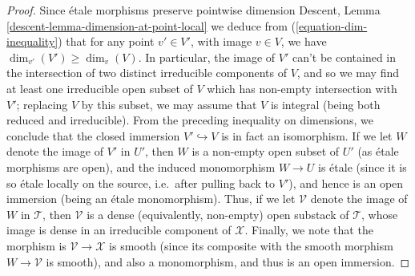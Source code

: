 \documentclass[10pt,a4paper]{amsart}
\theoremstyle{plain}
\theoremstyle{definition}
\theoremstyle{remark}
\numberwithin{equation}{subsection}
\begin{document}
\begin{proof}
\medskip\noindent
Since \'etale morphisms preserve pointwise dimension
Descent, Lemma \ref{descent-lemma-dimension-at-point-local}
we deduce from (\ref{equation-dim-inequality})
that for any point $v' \in V'$,
with image $v \in V$, we have
$\dim_{v'}( V') \geq \dim_v(V)$.
In particular, the image of $V'$ can't be contained in the intersection
of two distinct irreducible components of $V$, and so we may find
at least one irreducible open subset of $V$ which has non-empty intersection
with $V'$; replacing $V$ by this subset, we may assume that $V$ is integral
(being both reduced and irreducible).  From the preceding inequality
on dimensions, we conclude that the closed immersion $V' \hookrightarrow V$
is in fact an isomorphism.
If we let $W$ denote the image of $V'$
in $U'$, then $W$ is a non-empty
open subset of $U'$ (as \'etale morphisms are open),
and the induced monomorphism $W \to U$ is \'etale
(since it is so \'etale locally on the source, i.e.\ after pulling back
to $V'$), and hence is an open immersion (being an \'etale monomorphism).
Thus, if we let $\mathcal{V}$ denote the image of $W$ in $\mathcal{T}$,
then $\mathcal{V}$ is a dense (equivalently, non-empty) open substack of
$\mathcal{T}$,
whose image is dense in an irreducible component of $\mathcal{X}$.
Finally,
we note that the morphism is $\mathcal{V} \to \mathcal{X}$ is smooth
(since its composite
with the smooth morphism $W\to \mathcal{V}$ is smooth),
and also a monomorphism, and thus is an open immersion.
\end{proof}
\end{document}
